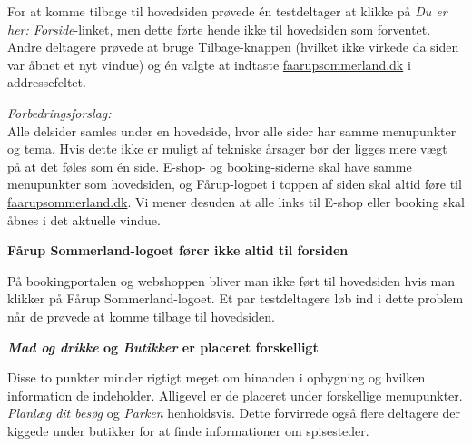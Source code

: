\documentclass[10pt,a4paper]{article}      %
\newenvironment{forslag}{\emph{Forbedringsforslag:}\\[0.5mm]}{}
\newcommand\pic[1]{\texttt{[image: Pics/\#1]}}
\renewcommand\smallproblem{\pic{smallproblem}}
\begin{document}
\begin{kommentarer}
For at komme tilbage til hovedsiden prøvede én testdeltager at klikke på
\emph{Du er her: Forside}-linket, men dette førte hende ikke til hovedsiden som
forventet. Andre deltagere prøvede at bruge Tilbage-knappen (hvilket ikke
virkede da siden var åbnet et nyt vindue) og én valgte at indtaste
\url{faarupsommerland.dk} i addressefeltet.

\begin{forslag}
Alle delsider samles under en hovedside, hvor alle sider har samme menupunkter og tema. Hvis dette ikke er muligt af tekniske årsager bør der ligges mere vægt på at det føles som én side. E-shop- og booking-siderne skal have samme menupunkter som hovedsiden, og Fårup-logoet i toppen af siden skal altid føre til \url{faarupsommerland.dk}. Vi mener desuden at alle links til E-shop eller booking skal åbnes i det aktuelle vindue.
\end{forslag}

\item[\smallproblem]{\textbf{Fårup Sommerland-logoet fører ikke altid til forsiden}}

På bookingportalen og webshoppen bliver man ikke ført til hovedsiden hvis man
klikker på Fårup Sommerland-logoet. Et par testdeltagere løb ind i dette problem
når de prøvede at komme tilbage til hovedsiden.

\item[\smallproblem] \textbf{\emph{Mad og drikke} og \emph{Butikker} er placeret forskelligt}

Disse to punkter minder rigtigt meget om hinanden i opbygning og hvilken
information de indeholder. Alligevel er de placeret under forskellige
menupunkter. \emph{Planlæg dit besøg} og \emph{Parken} henholdsvis. Dette
forvirrede også flere deltagere der kiggede under butikker for at finde
informationer om spisesteder.

\end{kommentarer}
\end{document}
